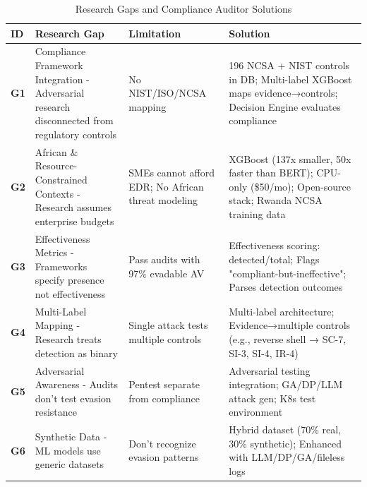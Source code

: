 \documentclass[11pt,conference]{IEEEtran}
\begin{document}
\begin{table}[htbp]
\centering
\caption{Research Gaps and Compliance Auditor Solutions}
\small
\begin{tabular}{p{}p{}p{}p{}}
\toprule
\textbf{ID} & \textbf{Research Gap} & \textbf{Limitation} & \textbf{Solution} \\
\midrule
\textbf{G1} & Compliance Framework Integration - Adversarial research disconnected from regulatory controls & No NIST/ISO/NCSA mapping & 196 NCSA + NIST controls in DB; Multi-label XGBoost maps evidence→controls; Decision Engine evaluates compliance \\
\midrule
\textbf{G2} & African \& Resource-Constrained Contexts - Research assumes enterprise budgets & SMEs cannot afford EDR; No African threat modeling & XGBoost (137x smaller, 50x faster than BERT); CPU-only (\$50/mo); Open-source stack; Rwanda NCSA training data \\
\midrule
\textbf{G3} & Effectiveness Metrics - Frameworks specify presence not effectiveness & Pass audits with 97\% evadable AV & Effectiveness scoring: detected/total; Flags "compliant-but-ineffective"; Parses detection outcomes \\
\midrule
\textbf{G4} & Multi-Label Mapping - Research treats detection as binary & Single attack tests multiple controls & Multi-label architecture; Evidence→multiple controls (e.g., reverse shell → SC-7, SI-3, SI-4, IR-4) \\
\midrule
\textbf{G5} & Adversarial Awareness - Audits don't test evasion resistance & Pentest separate from compliance & Adversarial testing integration; GA/DP/LLM attack gen; K8s test environment \\
\midrule
\textbf{G6} & Synthetic Data - ML models use generic datasets & Don't recognize evasion patterns & Hybrid dataset (70\% real, 30\% synthetic); Enhanced with LLM/DP/GA/fileless logs \\
\bottomrule
\end{tabular}
\label{tab:gap_solution_matrix}
\end{table}
\end{document}
